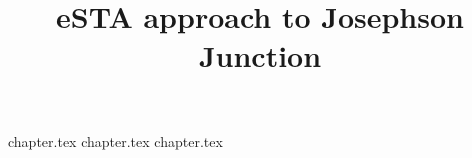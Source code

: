 \documentclass{article}
\title{eSTA approach to Josephson Junction}
\date{}
\author{}
\begin{document}

\maketitle

{chapter.tex}
{chapter.tex}
{chapter.tex}
%

\end{document}
